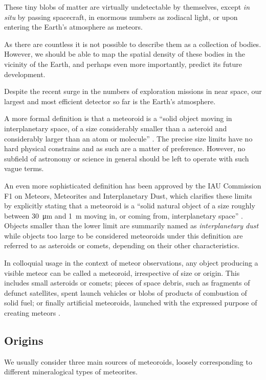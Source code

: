         These tiny blobs of matter are virtually undetectable by themselves, except \textit{in situ} by passing spacecraft,
        in enormous numbers as zodiacal light, or upon entering the Earth's atmosphere as meteors.

        As there are countless it is not possible to describe them as a collection of bodies.
        However, we should be able to map the spatial density of these bodies in the vicinity of the Earth,
        and perhaps even more importantly, predict its future development.

        Despite the recent surge in the numbers of exploration missions in near space,
        our largest and most efficient detector so far is the Earth's atmosphere.



        A more formal definition is that a meteoroid is a ``solid object moving in interplanetary space,
        of a size considerably smaller than a asteroid and considerably larger than an atom or molecule'' \citep{imo-glossary}.
        The precise size limits have no hard physical constrains and as such are a matter of preference.
        However, no subfield of astronomy or science in general should be left to operate with such vague terms.

        An even more sophisticated definition has been approved by the IAU Commission F1 on Meteors, Meteorites and Interplanetary Dust,
        which clarifies these limits by explicitly stating that a meteoroid is a ``solid natural object
        of a size roughly between \SI{30}{\micro\metre} and \SI{1}{\metre} moving in, or coming from, interplanetary space'' \citep{imo-definitions}.
        Objects smaller than the lower limit are summarily named as \emph{interplanetary dust} while objects
        too large to be considered meteoroids under this definition are referred to as
        asteroids or comets, depending on their other characteristics.

        In colloquial usage in the context of meteor observations, any object producing a visible meteor can be called a meteoroid,
        irrespective of size or origin. This includes small asteroids or comets; pieces of space debris,
        such as fragments of defunct satellites, spent launch vehicles or blobs of products of combustion of solid fuel;
        or finally artificial meteoroids, launched with the expressed purpose of creating meteors \citep{japončíci?}.

        \subsection{Origins} \label{iamo}
            We usually consider three main sources of meteoroids, loosely corresponding to different
            mineralogical types of meteorites.


